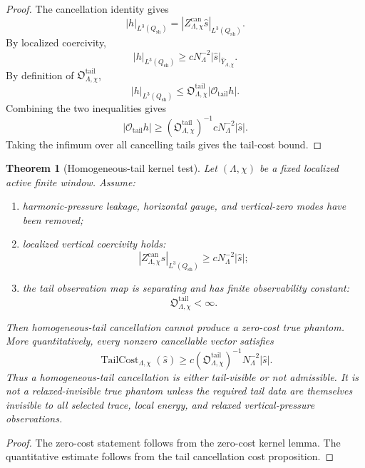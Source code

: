 \documentclass[11pt]{article}
\numberwithin{equation}{section}
\newtheorem{theorem}{Theorem}[section]
\begin{document}
\begin{proof}
The cancellation identity gives
\[
|h|_{L^3(Q_{\mathrm{sh}})} =
|Z_{\Lambda,\chi}^{\mathrm{can}}\widehat s|_{L^3(Q_{\mathrm{sh}})}.
\]
By localized coercivity,
\[
|h|_{L^3(Q_{\mathrm{sh}})}
\ge
cN_\Lambda^{-2}
|\widehat s|_{\widehat Y_{\Lambda,\chi}}.
\]
By definition of \(\mathfrak O_{\Lambda,\chi}^{\mathrm{tail}}\),
\[
|h|_{L^3(Q_{\mathrm{sh}})}
\le
\mathfrak O_{\Lambda,\chi}^{\mathrm{tail}}
|\mathcal O_{\mathrm{tail}}h|.
\]
Combining the two inequalities gives
\[
|\mathcal O_{\mathrm{tail}}h|
\ge
\left(\mathfrak O_{\Lambda,\chi}^{\mathrm{tail}}\right)^{-1}
cN_\Lambda^{-2}
|\widehat s|.
\]
Taking the infimum over all cancelling tails gives the tail-cost bound.
\end{proof}

\begin{theorem}[Homogeneous-tail kernel test]
Let \((\Lambda,\chi)\) be a fixed localized active finite window. Assume:

\begin{enumerate}
\item harmonic-pressure leakage, horizontal gauge, and vertical-zero modes have been removed;
\item localized vertical coercivity holds:
\[
|Z_{\Lambda,\chi}^{\mathrm{can}}\widehat s|_{L^3(Q_{\mathrm{sh}})}
\ge
cN_\Lambda^{-2}|\widehat s|;
\]
\item the tail observation map is separating and has finite observability constant:
\[
\mathfrak O_{\Lambda,\chi}^{\mathrm{tail}}<\infty.
\]
\end{enumerate}

Then homogeneous-tail cancellation cannot produce a zero-cost true phantom. More quantitatively, every nonzero cancellable vector satisfies
\begin{equation}
\operatorname{TailCost}_{\Lambda,\chi}(\widehat s)
\ge
c
\left(\mathfrak O_{\Lambda,\chi}^{\mathrm{tail}}\right)^{-1}
N_\Lambda^{-2}
|\widehat s|.
\label{eq:tag-10-231}
\end{equation}
Thus a homogeneous-tail cancellation is either tail-visible or not admissible. It is not a relaxed-invisible true phantom unless the required tail data are themselves invisible to all selected trace, local energy, and relaxed vertical-pressure observations.

\end{theorem}

\begin{proof}
The zero-cost statement follows from the zero-cost kernel lemma. The quantitative estimate follows from the tail cancellation cost proposition.
\end{proof}
\end{document}
